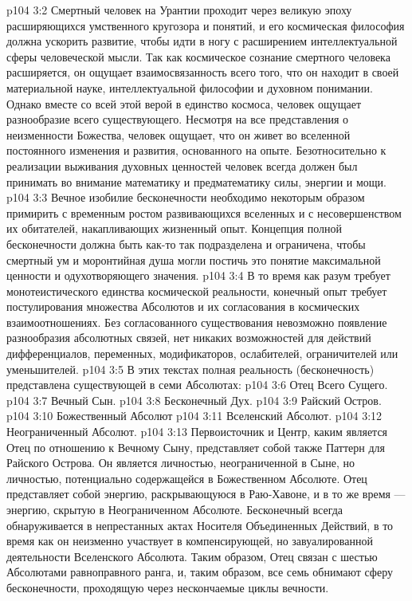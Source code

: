 \vs p104 3:2 Смертный человек на Урантии проходит через великую эпоху расширяющихся умственного кругозора и понятий, и его космическая философия должна ускорить развитие, чтобы идти в ногу с расширением интеллектуальной сферы человеческой мысли. Так как космическое сознание смертного человека расширяется, он ощущает взаимосвязанность всего того, что он находит в своей материальной науке, интеллектуальной философии и духовном понимании. Однако вместе со всей этой верой в единство космоса, человек ощущает разнообразие всего существующего. Несмотря на все представления о неизменности Божества, человек ощущает, что он живет во вселенной постоянного изменения и развития, основанного на опыте. Безотносительно к реализации выживания духовных ценностей человек всегда должен был принимать во внимание математику и предматематику силы, энергии и мощи.
\vs p104 3:3 Вечное изобилие бесконечности необходимо некоторым образом примирить с временным ростом развивающихся вселенных и с несовершенством их обитателей, накапливающих жизненный опыт. Концепция полной бесконечности должна быть как\hyp{}то так подразделена и ограничена, чтобы смертный ум и моронтийная душа могли постичь это понятие максимальной ценности и одухотворяющего значения.
\vs p104 3:4 В то время как разум требует монотеистического единства космической реальности, конечный опыт требует постулирования множества Абсолютов и их согласования в космических взаимоотношениях. Без согласованного существования невозможно появление разнообразия абсолютных связей, нет никаких возможностей для действий дифференциалов, переменных, модификаторов, ослабителей, ограничителей или уменьшителей.
\vs p104 3:5 \pc В этих текстах полная реальность (бесконечность) представлена существующей в семи Абсолютах:
\vs p104 3:6 \bibnobreakspace Отец Всего Сущего.
\vs p104 3:7 \bibnobreakspace Вечный Сын.
\vs p104 3:8 \bibnobreakspace Бесконечный Дух.
\vs p104 3:9 \bibnobreakspace Райский Остров.
\vs p104 3:10 \bibnobreakspace Божественный Абсолют
\vs p104 3:11 \bibnobreakspace Вселенский Абсолют.
\vs p104 3:12 \bibnobreakspace Неограниченный Абсолют.
\vs p104 3:13 \pc Первоисточник и Центр, каким является Отец по отношению к Вечному Сыну, представляет собой также Паттерн для Райского Острова. Он является личностью, неограниченной в Сыне, но личностью, потенциально содержащейся в Божественном Абсолюте. Отец представляет собой энергию, раскрывающуюся в Раю\hyp{}Хавоне, и в то же время --- энергию, скрытую в Неограниченном Абсолюте. Бесконечный всегда обнаруживается в непрестанных актах Носителя Объединенных Действий, в то время как он неизменно участвует в компенсирующей, но завуалированной деятельности Вселенского Абсолюта. Таким образом, Отец связан с шестью Абсолютами равноправного ранга, и, таким образом, все семь обнимают сферу бесконечности, проходящую через нескончаемые циклы вечности.
